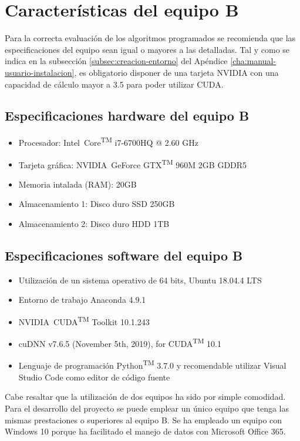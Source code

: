 \section{Características del equipo B}
\label{sec:caracteristicas-segun-equipob}

Para la correcta evaluación de los algoritmos programados se recomienda que las especificaciones del equipo sean igual o mayores a las detalladas. Tal y como se indica en la subsección \ref{subsec:creacion-entorno} del Apéndice \ref{cha:manual-usuario-instalacion}, es obligatorio disponer de una tarjeta NVIDIA con una capacidad de cálculo mayor a 3.5 para poder utilizar CUDA.

\subsection{Especificaciones hardware del equipo B}
\label{subsec:especificaciones-hardware-equipob}

\begin{itemize}
  \item Procesador: Intel\textregistered\ Core\textsuperscript{TM} i7-6700HQ @ 2.60 GHz
  \item Tarjeta gráfica: NVIDIA\textregistered\ GeForce GTX\textsuperscript{TM} 960M 2GB GDDR5
  \item Memoria intalada (RAM): 20GB
  \item Almacenamiento 1: Disco duro SSD 250GB
  \item Almacenamiento 2: Disco duro HDD 1TB
\end{itemize}

\subsection{Especificaciones software del equipo B}
\label{subsec:especificaciones-software-equipob}
\begin{itemize}
  \item Utilización de un sistema operativo de 64 bits, Ubuntu 18.04.4 LTS
  \item Entorno de trabajo Anaconda 4.9.1
  \item NVIDIA\textregistered\ CUDA\textsuperscript{TM} Toolkit 10.1.243 
  \item cuDNN v7.6.5 (November 5th, 2019), for CUDA\textsuperscript{TM} 10.1
  \item Lenguaje de programación Python\textsuperscript{TM} 3.7.0 y recomendable utilizar Visual Studio Code como editor de código fuente
\end{itemize}

Cabe resaltar que la utilización de dos equipos ha sido por simple comodidad. Para el desarrollo del proyecto se puede emplear un único equipo que tenga las mismas prestaciones o superiores al equipo B. Se ha empleado un equipo con Windows 10 porque ha facilitado el manejo de datos con Microsoft Office 365.